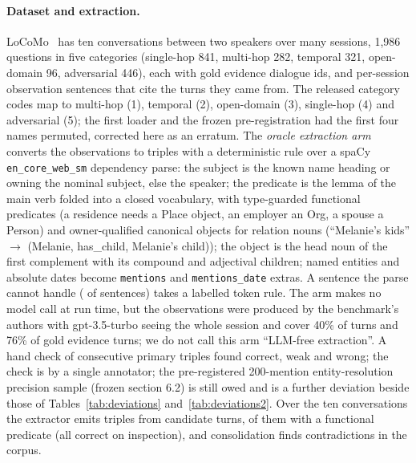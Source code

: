 \documentclass{ceurart}
\newcommand{\code}[1]{\texttt{#1}}
\begin{document}
\paragraph{Dataset and extraction.} LoCoMo~\cite{maharana2024locomo} has ten conversations between two speakers over many sessions, 1,986 questions in five categories (single-hop 841, multi-hop 282, temporal 321, open-domain 96, adversarial 446), each with gold evidence dialogue ids, and \nObsSentences{} per-session observation sentences that cite the turns they came from. The released category codes map to multi-hop (1), temporal (2), open-domain (3), single-hop (4) and adversarial (5); the first loader and the frozen pre-registration had the first four names permuted, corrected here as an erratum. The \emph{oracle extraction arm} converts the observations to triples with a deterministic rule over a spaCy \code{en\_core\_web\_sm} dependency parse: the subject is the known name heading or owning the nominal subject, else the speaker; the predicate is the lemma of the main verb folded into a closed vocabulary, with type-guarded functional predicates (a residence needs a Place object, an employer an Org, a spouse a Person) and owner-qualified canonical objects for relation nouns (``Melanie's kids'' $\to$ (Melanie, has\_child, Melanie's child)); the object is the head noun of the first complement with its compound and adjectival children; named entities and absolute dates become \code{mentions} and \code{mentions\_date} extras. A sentence the parse cannot handle (\extFallbackShare{} of sentences) takes a labelled token rule. The arm makes no model call at run time, but the observations were produced by the benchmark's authors with gpt-3.5-turbo seeing the whole session and cover 40\% of turns and 76\% of gold evidence turns; we do not call this arm ``LLM-free extraction''. A hand check of \extHandCheckN{} consecutive primary triples found \extHandCheckOk{} correct, \extHandCheckWeak{} weak and \extHandCheckWrong{} wrong; the check is by a single annotator; the pre-registered 200-mention entity-resolution precision sample (frozen section 6.2) is still owed and is a further deviation beside those of Tables~\ref{tab:deviations} and~\ref{tab:deviations2}. Over the ten conversations the extractor emits \nCandTriplesLc{} triples from \nCandTurnsLc{} candidate turns, \extFunctionalTriples{} of them with a functional predicate (all correct on inspection), and consolidation finds \extInvalidations{} contradictions in the corpus.
\end{document}
